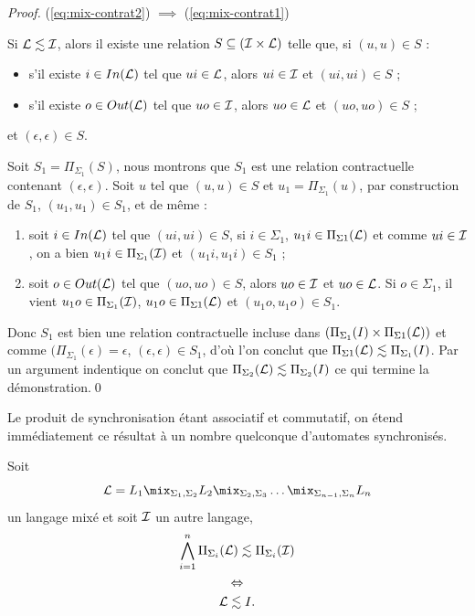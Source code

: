 \begin{proof}
(\ref{eq:mix-contrat2}) $\implies$ (\ref{eq:mix-contrat1})

Si ${\cal L}\lesssim {\cal I}$, alors il existe une  relation $S\subseteq
({\cal I}\times{}{\cal L})$ telle que, si $(u,u)\in S$  :
\begin{itemize}
  \item s'il existe $i\in In({\cal L})$ tel que $ui\in {\cal L}$, alors
    $ui\in {\cal I}$ et $(ui,ui)\in S$ ;
  \item s'il existe $o\in Out({\cal L})$ tel que $uo\in {\cal I}$, alors
    $uo\in {\cal L}$ et $(uo,uo)\in S$ ;
\end{itemize}
et $(\epsilon, \epsilon)\in S$.

Soit $S_1=\Pi_{\Sigma_1}(S)$, nous montrons que $S_1$ est une relation
contractuelle contenant $(\epsilon,\epsilon)$. Soit $u$ tel que
$(u,u)\in S$ et $u_1= \Pi_{\Sigma_1}(u)$, par construction de $S_1$,
$(u_1,u_1)\in S_1$, et de m\^eme :
\begin{enumerate}
  \item soit $i \in In({\cal L})$ tel que $(ui,ui)\in S$, si $i\in
  \Sigma_1$, $u_1i\in \Pi_{\Sigma1}({\cal L})$ et comme $ui\in {\cal I}$, on a bien $u_1i
  \in \Pi_{\Sigma_1}({\cal I})$ et  $(u_1i,u_1i)\in S_1$ ;
  \item soit $o \in Out({\cal L})$ tel que $(uo,uo)\in S$, alors $uo \in
  {\cal I}$ et $uo \in {\cal L}$. Si $o\in \Sigma_1$, il vient $u_1o
  \in \Pi_{\Sigma_1}({\cal I})$,  $u_1o\in
  \Pi_{\Sigma1}({\cal L})$ et $(u_1o,u_1o)\in S_1$.
\end{enumerate}
Donc $S_1$ est bien une relation contractuelle incluse dans
$(\Pi_{\Sigma_1}(I)\times{}\Pi_{\Sigma1}({\cal L}))$ et comme $(\Pi_{\Sigma_1}(\epsilon) =
\epsilon$, $(\epsilon,\epsilon)\in S_1$, d'o\`u l'on conclut que
$\Pi_{\Sigma1}({\cal L})\lesssim \Pi_{\Sigma_1}(I)$. Par un argument indentique on conclut
que $\Pi_{\Sigma_2}({\cal L})\lesssim \Pi_{\Sigma_2}(I)$ ce qui termine la d\'emonstration.\hfill\qed

\end{proof}

Le produit de synchronisation \'etant associatif et commutatif, on
\'etend imm\'ediatement ce r\'esultat \`a un nombre quelconque
d'automates synchronis\'es. 

\begin{prop}
Soit $${\cal L} = L_1\mix_{\Sigma_1,\Sigma_2} L_2
\mix_{\Sigma_2,\Sigma_3} \dots \mix_{\Sigma_{n-1},\Sigma_n} L_n$$ un
langage mix\'e et soit ${\cal I}$ un autre langage, 
\begin{gather*}    
\bigwedge_{i=1}^n \Pi_{\Sigma_i}({\cal L})\lesssim \Pi_{\Sigma_i}({\cal I}) \\
    \Leftrightarrow \\
{\cal L}\lesssim I.
\end{gather*}
\end{prop}

